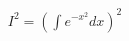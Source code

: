 \documentclass[preview]{standalone}
\begin{document}
\begin{align*}
I^2 = \left(\int e^{-x^2} dx\right)^2
\end{align*}
\end{document}
